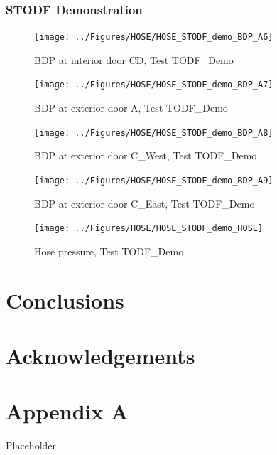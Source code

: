 \documentclass[11pt,oneside]{book}
\begin{document}
\clearpage


\subsection{STODF Demonstration}

\begin{figure}[!ht]
\texttt{[image: ../Figures/HOSE/HOSE\_STODF\_demo\_BDP\_A6]}
\caption{BDP at interior door CD, Test TODF\_Demo}
\label{fig:HOSE_STODF_demo_BDP_A6}
\end{figure}

\begin{figure}[!ht]
\texttt{[image: ../Figures/HOSE/HOSE\_STODF\_demo\_BDP\_A7]}
\caption{BDP at exterior door A, Test TODF\_Demo}
\label{fig:HOSE_STODF_demo_BDP_A7}
\end{figure}

\begin{figure}[!ht]
\texttt{[image: ../Figures/HOSE/HOSE\_STODF\_demo\_BDP\_A8]}
\caption{BDP at exterior door C\_West, Test TODF\_Demo}
\label{fig:HOSE_STODF_demo_BDP_A8}
\end{figure}

\begin{figure}[!ht]
\texttt{[image: ../Figures/HOSE/HOSE\_STODF\_demo\_BDP\_A9]}
\caption{BDP at exterior door C\_East, Test TODF\_Demo}
\label{fig:HOSE_STODF_demo_BDP_A9}
\end{figure}

\begin{figure}[!ht]
\texttt{[image: ../Figures/HOSE/HOSE\_STODF\_demo\_HOSE]}
\caption{Hose pressure, Test TODF\_Demo}
\label{fig:HOSE_STODF_demo_HOSE}
\end{figure}


\chapter{Conclusions}
\label{chap:Conclusions}

\chapter{Acknowledgements}
\label{chap:Acknowledgements}



\appendix

\chapter{Appendix A}

Placeholder
\end{document}
